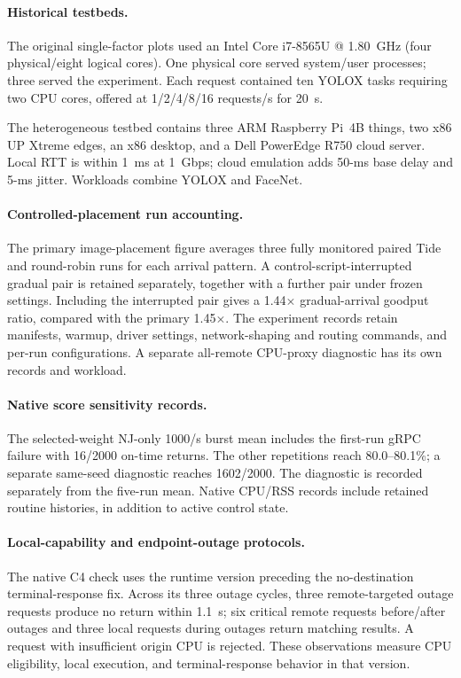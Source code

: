 \paragraph{Historical testbeds.}
The original single-factor plots used an Intel Core i7-8565U @ 1.80~GHz (four physical/eight logical cores). One physical core served system/user processes; three served the experiment. Each request contained ten YOLOX tasks requiring two CPU cores, offered at 1/2/4/8/16 requests/s for 20~s.

The heterogeneous testbed contains three ARM Raspberry Pi~4B things, two x86 UP Xtreme edges, an x86 desktop, and a Dell PowerEdge R750 cloud server. Local RTT is within 1~ms at 1~Gbps; cloud emulation adds 50-ms base delay and 5-ms jitter. Workloads combine YOLOX and FaceNet.


\paragraph{Controlled-placement run accounting.}
The primary image-placement figure averages three fully monitored paired Tide and round-robin runs for each arrival pattern. A control-script-interrupted gradual pair is retained separately, together with a further pair under frozen settings. Including the interrupted pair gives a 1.44$\times$ gradual-arrival goodput ratio, compared with the primary 1.45$\times$. The experiment records retain manifests, warmup, driver settings, network-shaping and routing commands, and per-run configurations. A separate all-remote CPU-proxy diagnostic has its own records and workload.

\paragraph{Native score sensitivity records.}
The selected-weight NJ-only 1000/s burst mean includes the first-run gRPC failure with 16/2000 on-time returns. The other repetitions reach 80.0--80.1\%; a separate same-seed diagnostic reaches 1602/2000. The diagnostic is recorded separately from the five-run mean. Native CPU/RSS records include retained routine histories, in addition to active control state.

\paragraph{Local-capability and endpoint-outage protocols.}
The native C4 check uses the runtime version preceding the no-destination terminal-response fix. Across its three outage cycles, three remote-targeted outage requests produce no return within 1.1~s; six critical remote requests before/after outages and three local requests during outages return matching results. A request with insufficient origin CPU is rejected. These observations measure CPU eligibility, local execution, and terminal-response behavior in that version.

